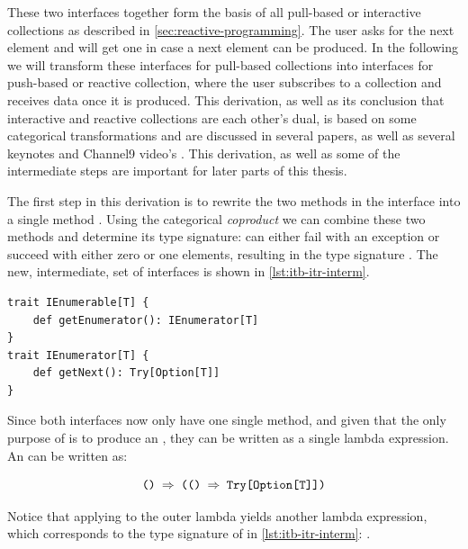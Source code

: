 These two interfaces together form the basis of all pull-based or interactive collections as described in \autoref{sec:reactive-programming}. The user asks for the next element and will get one in case a next element can be produced. In the following we will transform these interfaces for pull-based collections into interfaces for push-based or reactive collection, where the user subscribes to a collection and receives data once it is produced. This derivation, as well as its conclusion that interactive and reactive collections are each other's dual, is based on some categorical transformations and are discussed in several papers, as well as several keynotes and Channel9 video's \cite{meijer2010-Observable, meijer2012-YMIAD, E2E-Rx, meijer2014-Duality-And-The-End-Of-Reactive}. This derivation, as well as some of the intermediate steps are important for later parts of this thesis.

The first step in this derivation is to rewrite the two methods in the \ier interface into a single method . Using the categorical \textit{coproduct} \cite{rydeheard1988-Category-Theory} we can combine these two methods and determine its type signature:  can either fail with an exception or succeed with either zero or one elements, resulting in the type signature . The new, intermediate, set of interfaces is shown in \autoref{lst:itb-itr-interm}.

\begin{minipage}{\linewidth}
\begin{lstlisting}[style=ScalaStyle, caption={\ier interface after applying coproduct}, label={lst:itb-itr-interm}]
trait IEnumerable[T] {
    def getEnumerator(): IEnumerator[T]
}
trait IEnumerator[T] {
    def getNext(): Try[Option[T]]
}
\end{lstlisting}
\end{minipage}

Since both interfaces now only have one single method, and given that the only purpose of \ieb is to produce an \ier, they can be written as a single lambda expression. An \ieb can be written as:

\begin{equation} \label{eq:itb}
\code{() $\Rightarrow$ (() $\Rightarrow$ Try[Option[T]])}
\end{equation}

Notice that applying  to the outer lambda yields another lambda expression, which corresponds to the type signature of  in \autoref{lst:itb-itr-interm}: .

